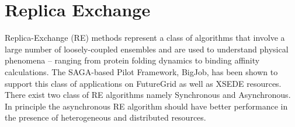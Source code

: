 \documentclass[]{paper}
\begin{document}
\section{Replica Exchange}

Replica-Exchange (RE) methods represent a class of algorithms that involve a large number of loosely-coupled ensembles and are used to understand physical phenomena – ranging from protein folding dynamics to binding affinity calculations. The SAGA-based Pilot Framework, BigJob, has been shown to support this class of applications on FutureGrid as well as XSEDE resources.  There exist two class of RE algorithms namely Synchronous and Asynchronous.  In principle the asynchronous RE algorithm should have better performance in the presence of heterogeneous and distributed resources.


\end{document}

